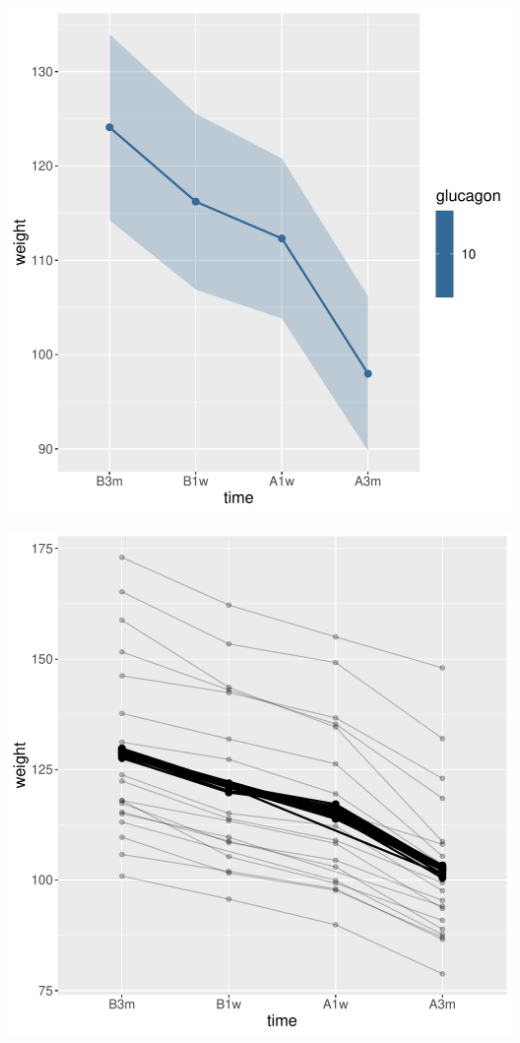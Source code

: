 \documentclass[12pt]{article}
\begin{document}
\begin{minipage}{0.45\linewidth}
\begin{center}
\includegraphics[width=\textwidth]{./figures/fit10-autoplot.pdf}
\end{center}
\end{minipage}
\begin{minipage}{0.45\linewidth}
\begin{center}
\includegraphics[width=\textwidth]{./figures/fitAll-autoplot.pdf}
\end{center}
\end{minipage}
\end{document}
